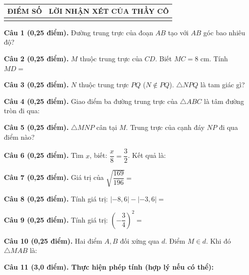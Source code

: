 \documentclass[12pt,a4paper]{article}
\begin{document}
\vspace{1.0mm}

\noindent
\begin{tabularx}{\linewidth}{|p{3.2cm}|X|}
\hline
\centering\textbf{ĐIỂM SỐ} & \centering\textbf{LỜI NHẬN XÉT CỦA THẦY CÔ} \tabularnewline
\hline
\rule{0pt}{1.8cm} & \tabularnewline
\hline
\end{tabularx}

\vspace{1.2mm}
\noindent\textbf{Câu 1 (0,25 điểm).} Đường trung trực của đoạn $AB$ tạo với $AB$ góc bao nhiêu độ? \par\vspace{2.0mm}
\noindent\textbf{Câu 2 (0,25 điểm).} $M$ thuộc trung trực của $CD$. Biết $MC = 8\text{ cm}$. Tính $MD =$ \par\vspace{2.0mm}
\noindent\textbf{Câu 3 (0,25 điểm).} $N$ thuộc trung trực $PQ$ ($N \notin PQ$). $\triangle NPQ$ là tam giác gì? \par\vspace{2.0mm}
\noindent\textbf{Câu 4 (0,25 điểm).} Giao điểm ba đường trung trực của $\triangle ABC$ là tâm đường tròn đi qua: \par\vspace{2.0mm}
\noindent\textbf{Câu 5 (0,25 điểm).} $\triangle MNP$ cân tại $M$. Trung trực của cạnh đáy $NP$ đi qua điểm nào? \par\vspace{2.0mm}
\noindent\textbf{Câu 6 (0,25 điểm).} Tìm $x$, biết: $\dfrac{x}{8} = \dfrac{3}{2}$. Kết quả là: \par\vspace{2.0mm}
\noindent\textbf{Câu 7 (0,25 điểm).} Giá trị của $\sqrt{\dfrac{169}{196}} =$ \par\vspace{2.0mm}
\noindent\textbf{Câu 8 (0,25 điểm).} Tính giá trị: $|-8{,}6| - |-3{,}6| =$ \par\vspace{2.0mm}
\noindent\textbf{Câu 9 (0,25 điểm).} Tính giá trị: $\left(-\dfrac{3}{4}\right)^2 =$ \par\vspace{2.0mm}
\noindent\textbf{Câu 10 (0,25 điểm).} Hai điểm $A, B$ đối xứng qua $d$. Điểm $M \in d$. Khi đó $\triangle MAB$ là: \par\vspace{2.0mm}
\vspace{0.6mm}
\noindent\textbf{Câu 11 (3,0 điểm). Thực hiện phép tính (hợp lý nếu có thể):}
\vspace{0.6mm}
\end{document}
